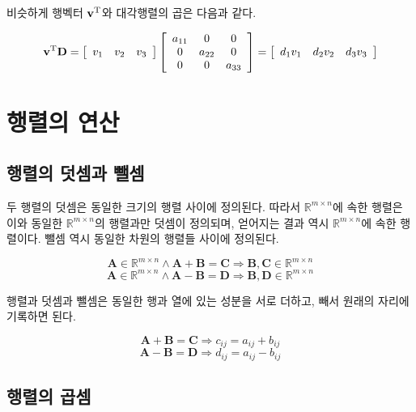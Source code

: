 비슷하게 행벡터 $\mathbf v^{\rm T}$와 대각행렬의 곱은 다음과 같다.

$$
\mathbf v^{\rm T} \mathbf D = 
\left [
\begin{array}{ccc}
v_1 & v_2 & v_3 \\
\end{array}
\right ]
\left [ 
\begin{array}{ccc}
a_{11} & 0 & 0 \\
0 & a_{22} & 0 \\
0 & 0 & a_{33} \\
\end{array}
\right ]
=
\left [
\begin{array}{ccc}
d_1 v_1 & d_2 v_2 &d_3 v_3 \\
\end{array}
\right ]
$$

\section{행렬의 연산}

\subsection{행렬의 덧셈과 뺄셈}

두 행렬의 덧셈은 동일한 크기의 행렬 사이에 정의된다.
따라서 $\mathbb R^{m \times n}$에 속한 행렬은 이와 동일한  $\mathbb R^{m \times n}$의 행렬과만 덧셈이 정의되며,
얻어지는 결과 역시  $\mathbb R^{m \times n}$에 속한 행렬이다.
뺄셈 역시 동일한 차원의 행렬들 사이에 정의된다.

$$\mathbf A \in \mathbb R^{m \times n}  \wedge \mathbf A + \mathbf B = \mathbf C \Rightarrow \mathbf B, \mathbf C \in \mathbb R^{m \times n}$$
$$\mathbf A \in \mathbb R^{m \times n}  \wedge \mathbf A - \mathbf B = \mathbf D \Rightarrow \mathbf B, \mathbf D \in \mathbb R^{m \times n}$$

행렬과 덧셈과 뺄셈은 동일한 행과 열에 있는 성분을 서로 더하고, 빼서 원래의 자리에 기록하면 된다.

$$\mathbf A + \mathbf B = \mathbf C \Rightarrow c_{ij} = a_{ij} + b_{ij}$$
$$\mathbf A - \mathbf B = \mathbf D \Rightarrow d_{ij} = a_{ij} - b_{ij}$$


\subsection{행렬의 곱셈}

